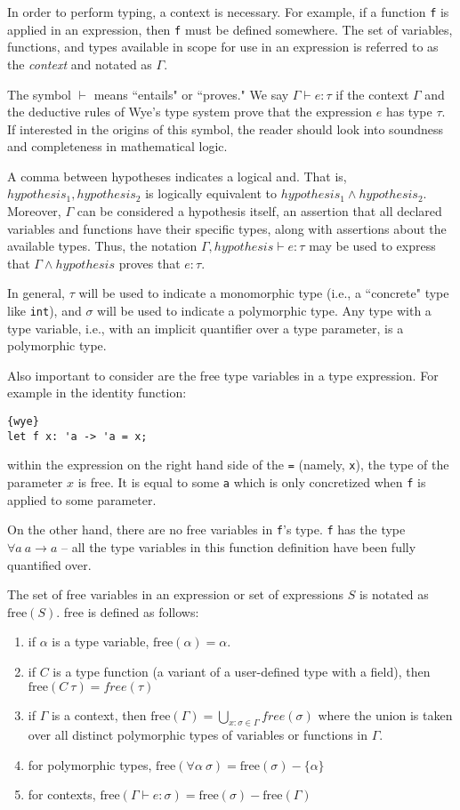 \documentclass[a4paper, 12pt]{article}
\newcommand{\free}{\text{free}}
\begin{document}
In order to perform typing, a context is necessary. For example, if a function \texttt{f} is applied in an expression, then \texttt{f} must be defined somewhere. The set of variables, functions, and types available in scope for use in an expression is referred to as the \textit{context} and notated as $\Gamma$.

The symbol $\vdash$ means ``entails" or ``proves." We say $\Gamma\vdash e: \tau$ if the context $\Gamma$ and the deductive rules of Wye's type system prove that the expression $e$ has type $\tau$. If interested in the origins of this symbol, the reader should look into soundness and completeness in mathematical logic.

A comma between hypotheses indicates a logical and. That is, $hypothesis_1, hypothesis_2$ is logically equivalent to $hypothesis_1 \wedge hypothesis_2$. Moreover, $\Gamma$ can be considered a hypothesis itself, an assertion that all declared variables and functions have their specific types, along with assertions about the available types. Thus, the notation $\Gamma, hypothesis \vdash e: \tau$ may be used to express that $\Gamma \wedge hypothesis$ proves that $e: \tau$.

In general, $\tau$ will be used to indicate a monomorphic type (i.e., a ``concrete" type like \texttt{int}), and $\sigma$ will be used to indicate a polymorphic type. Any type with a type variable, i.e., with an implicit quantifier over a type parameter, is a polymorphic type.

Also important to consider are the free type variables in a type expression. For example in the identity function:
\begin{lstlisting}{wye}
let f x: 'a -> 'a = x;
\end{lstlisting}
within the expression on the right hand side of the \texttt{=} (namely, \texttt{x}), the type of the parameter $x$ is free. It is equal to some \texttt{a} which is only concretized when \texttt{f} is applied to some parameter.

On the other hand, there are no free variables in \texttt{f}'s type. \texttt{f} has the type $\forall a\: a\to a$ -- all the type variables in this function definition have been fully quantified over.

The set of free variables in an expression or set of expressions $S$ is notated as $\free(S)$. free is defined as follows:
\begin{enumerate}
\item if $\alpha$ is a type variable, $\free(\alpha) = \alpha$.
\item if $C$ is a type function (a variant of a user-defined type with a field), then $\free(C\: \tau) = free(\tau)$
\item if $\Gamma$ is a context, then $\free(\Gamma) = \bigcup_{x : \sigma\in\Gamma }free(\sigma)$ where the union is taken over all distinct polymorphic types of variables or functions in $\Gamma$.
\item for polymorphic types, $\free(\forall \alpha \: \sigma) = \free(\sigma) - \{\alpha\}$
\item for contexts, $\free(\Gamma\vdash e: \sigma) = \free(\sigma) - \free(\Gamma)$
\end{enumerate}
\end{document}

